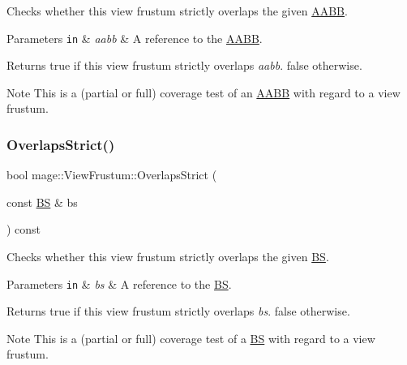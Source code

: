 Checks whether this view frustum strictly overlaps the given \hyperlink{structmage_1_1_a_a_b_b}{A\+A\+BB}.


\begin{DoxyParams}[1]{Parameters}
\mbox{\tt in}  & {\em aabb} & A reference to the \hyperlink{structmage_1_1_a_a_b_b}{A\+A\+BB}. \\
\hline
\end{DoxyParams}
\begin{DoxyReturn}{Returns}
{\ttfamily true} if this view frustum strictly overlaps {\itshape aabb}. {\ttfamily false} otherwise. 
\end{DoxyReturn}
\begin{DoxyNote}{Note}
This is a (partial or full) coverage test of an \hyperlink{structmage_1_1_a_a_b_b}{A\+A\+BB} with regard to a view frustum. 
\end{DoxyNote}
\hypertarget{structmage_1_1_view_frustum_a05963d6685c8cafc22be50c8e9b405df}{}\label{structmage_1_1_view_frustum_a05963d6685c8cafc22be50c8e9b405df} 
\subsubsection{\texorpdfstring{Overlaps\+Strict()}{OverlapsStrict()}\hspace{0.1cm}{\footnotesize\ttfamily [2/2]}}
{\footnotesize\ttfamily bool mage\+::\+View\+Frustum\+::\+Overlaps\+Strict (\begin{DoxyParamCaption}\item[{const \hyperlink{structmage_1_1_b_s}{BS} \&}]{bs }\end{DoxyParamCaption}) const\hspace{0.3cm}{\ttfamily [noexcept]}}

Checks whether this view frustum strictly overlaps the given \hyperlink{structmage_1_1_b_s}{BS}.


\begin{DoxyParams}[1]{Parameters}
\mbox{\tt in}  & {\em bs} & A reference to the \hyperlink{structmage_1_1_b_s}{BS}. \\
\hline
\end{DoxyParams}
\begin{DoxyReturn}{Returns}
{\ttfamily true} if this view frustum strictly overlaps {\itshape bs}. {\ttfamily false} otherwise. 
\end{DoxyReturn}
\begin{DoxyNote}{Note}
This is a (partial or full) coverage test of a \hyperlink{structmage_1_1_b_s}{BS} with regard to a view frustum. 
\end{DoxyNote}


